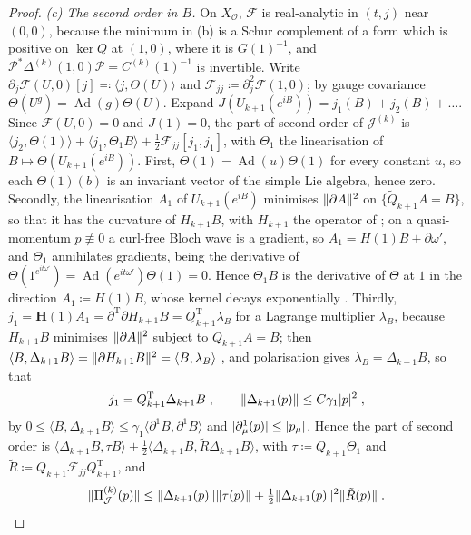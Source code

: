 \documentclass[11pt]{preprint}
\DeclarePairedDelimiter{\abs}{\lvert}{\rvert}
\DeclarePairedDelimiter{\norm}{\lVert}{\rVert}
\numberwithin{equation}{section}
\theoremstyle{definition}
\theoremstyle{remark}
\theoremstyle{plain}
\begin{document}
\begin{proof}
\emph{(c) The second order in $B$.} On $X_{\mathcal O}$, $\mathcal F$ is real-analytic in $(t, j)$ near $(0, 0)$, because the minimum in (b) is a Schur complement of a form which is positive on $\ker Q$ at $(1, 0)$, where it is $G(1)^{-1}$, and $\mathcal P^*\Delta^{(k)}(1, 0)\mathcal P = C^{(k)}(1)^{-1}$ is invertible. Write $\partial_j\mathcal F(U, 0)[j] \eqqcolon \langle j, \Theta(U) \rangle$ and $\mathcal F_{jj} \coloneqq \partial_j^2\mathcal F(1, 0)$; by gauge covariance $\Theta(U^g) = \operatorname{Ad}(g)\Theta(U)$. Expand $J(U_{k+1}(e^{iB})) = j_1(B) + j_2(B) + \dots$. Since $\mathcal F(U, 0) = 0$ and $J(1) = 0$, the part of second order of $\mathcal J^{(k)}$ is $\langle j_2, \Theta(1) \rangle + \langle j_1, \Theta_1B \rangle + \frac12\mathcal F_{jj}[j_1, j_1]$, with $\Theta_1$ the linearisation of $B \mapsto \Theta(U_{k+1}(e^{iB}))$. First, $\Theta(1) = \operatorname{Ad}(u)\Theta(1)$ for every constant $u$, so each $\Theta(1)(b)$ is an invariant vector of the simple Lie algebra, hence zero. Secondly, the linearisation $A_1$ of $U_{k+1}(e^{iB})$ minimises $\norm{\partial A}^2$ on $\{ \tilde Q_{k+1}A = B \}$, so that it has the curvature of $H_{k+1}B$, with $H_{k+1}$ the operator of \cite[(1.65), p.~29]{BalabanPRT1}; on a quasi-momentum $p \not\equiv 0$ a curl-free Bloch wave is a gradient, so $A_1 = H(1)B + \partial\omega'$, and $\Theta_1$ annihilates gradients, being the derivative of $\Theta(1^{e^{it\omega'}}) = \operatorname{Ad}(e^{it\omega'})\Theta(1) = 0$. Hence $\Theta_1B$ is the derivative of $\Theta$ at $1$ in the direction $A_1 \coloneqq H(1)B$, whose kernel decays exponentially \cite[(3.133), p.~422]{BalabanPBG}. Thirdly, $j_1 = \mathbf H(1)A_1 = \partial^{\mathrm T}\partial H_{k+1}B = Q_{k+1}^{\mathrm T}\lambda_B$ for a Lagrange multiplier $\lambda_B$, because $H_{k+1}B$ minimises $\norm{\partial A}^2$ subject to $Q_{k+1}A = B$; then $\langle B, \Delta_{k+1}B \rangle = \norm{\partial H_{k+1}B}^2 = \langle B, \lambda_B \rangle$ \cite[p.~29]{BalabanPRT1}, and polarisation gives $\lambda_B = \Delta_{k+1}B$, so that
\begin{equation}\label{eq:current-leg}
    j_1 = Q_{k+1}^{\mathrm T}\Delta_{k+1}B\;,
    \qquad
    \norm{\Delta_{k+1}(p)} \leq C\gamma_1\abs{p}^2\;,
\end{equation}
by $0 \leq \langle B, \Delta_{k+1}B \rangle \leq \gamma_1\langle\partial^1B, \partial^1B\rangle$ \cite[(1.67), p.~29]{BalabanPRT1} and $\abs{\partial^1_\mu(p)} \leq \abs{p_\mu}$. Hence the part of second order is $\langle\Delta_{k+1}B, \tau B\rangle + \frac12\langle\Delta_{k+1}B, \tilde R\Delta_{k+1}B\rangle$, with $\tau \coloneqq Q_{k+1}\Theta_1$ and $\tilde R \coloneqq Q_{k+1}\mathcal F_{jj}Q_{k+1}^{\mathrm T}$, and
\begin{equation}\label{eq:current-polarisation-split}
    \norm{\Pi^{(k)}_{\mathcal J}(p)} \leq \norm{\Delta_{k+1}(p)}\norm{\tau(p)} + \tfrac12\norm{\Delta_{k+1}(p)}^2\norm{\tilde R(p)}\;.
\end{equation}


\end{proof}
\end{document}
